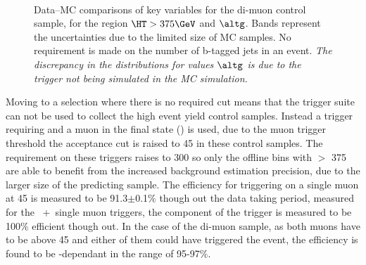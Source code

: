 \begin{figure}[|h]
  \centering
   \\
  \caption{Data--MC comparisons of key variables for the di-muon control
    sample, for the region $\HT > 375\GeV$ and $\altg$. Bands represent the uncertainties due to the limited size
    of MC samples. No requirement is made on the number of b-tagged
    jets in an event. {\it The discrepancy in the \alt
      distributions for values $\altg$ is due to the trigger
      not being simulated in the MC simulation.}}
    \label{fig:diMuControl}
\end{figure}


Moving to a selection where there is no required \alt cut means that the \alt 
trigger suite can not be used to collect the high event yield control samples. 
Instead a trigger requiring \HT and a muon in the final state (\muht) is used, 
due to the muon trigger threshold the \PT acceptance cut is raised to 
\unit{45}{\GeV} in these control samples. The \HT requirement on these triggers 
raises to \unit{300}{\GeV} so only the offline bins with \HT $>$ 
\unit{375}{\GeV} are able to benefit from the increased background estimation 
precision, due to the larger size of the predicting sample. The efficiency for 
triggering on a single muon at \unit{45}{\GeV} is measured to be 
91.3$\pm$0.1$\%$ though out the data taking period, measured for the 
\HT~+~single muon triggers, the \HT component of the trigger is measured to be 
100$\%$ efficient though out. In the case of the di-muon sample, as both muons 
have to be above \unit{45}{\GeV} and either of them could have triggered the 
event, the efficiency is found to be \HT-dependant in the range of 95-97$\%$.

